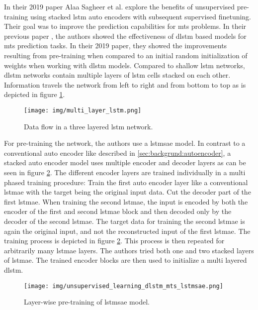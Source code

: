 In their 2019 paper \cite{unsupervised_learning_lstms_timeseries} Alaa Sagheer et al. explore the benefits of unsupervised pre-training using stacked \gls{lstm} auto encoders with subsequent supervised finetuning. Their goal was to improve the prediction capabilities for \gls{mts} problems. In their previous paper \cite{dlstm_time_series_forecasting}, the authors showed the effectiveness of \gls{dlstm} based models for \gls{mts} prediction tasks. In their 2019 paper, they showed the improvements resulting from pre-training when compared to an initial random initialization of weights when working with \gls{dlstm} models. Compared to shallow \gls{lstm} networks, \gls{dlstm} networks contain multiple layers of \gls{lstm} cells stacked on each other. Information travels the network from left to right and from bottom to top as is depicted in figure \ref{fig:stateofart:unsupervised_learning_with_lstms_dlstm}. 

\begin{figure}[h]
	\centering
	\texttt{[image: img/multi\_layer\_lstm.png]}
	\caption{Data flow in a three layered \gls{lstm} network.}
	\label{fig:stateofart:unsupervised_learning_with_lstms_dlstm}
\end{figure}

For pre-training the network, the authors use a \gls{lstmsae} model. In contrast to a conventional auto encoder like described in \ref{sec:backgrund:autoencoder}, a stacked auto encoder model uses multiple encoder and decoder layers as can be seen in figure \ref{fig:stateofart:unsupervised_learning_dlstm_mts_lstmsae}. The different encoder layers are trained individually in a multi phased training procedure: Train the first auto encoder layer like a conventional \gls{lstmae} with the target being the original input data. Cut the decoder part of the first \gls{lstmae}. When training the second \gls{lstmae}, the input is encoded by both the encoder of the first and second \gls{lstmae} block and then decoded only by the decoder of the second \gls{lstmae}. The target data for training the second \gls{lstmae} is again the original input, and not the reconstructed input of the first \gls{lstmae}. The training process is depicted in figure \ref{fig:stateofart:unsupervised_learning_dlstm_mts_lstmsae}. This process is then repeated for arbitrarily many \gls{lstmae} layers. The authors tried both one and two stacked layers of \gls{lstmae}. The trained encoder blocks are then used to initialize a multi layered \gls{dlstm}.

\begin{figure}[h]
	\centering
	\texttt{[image: img/unsupervised\_learning\_dlstm\_mts\_lstmsae.png]}
	\caption{Layer-wise pre-training of \gls{lstmsae} model. \cite{unsupervised_learning_lstms_timeseries}}
	\label{fig:stateofart:unsupervised_learning_dlstm_mts_lstmsae}
\end{figure}

